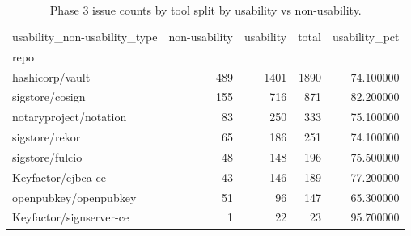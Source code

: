 \begin{table}[t]
\centering
\caption{Phase 3 issue counts by tool split by usability vs non-usability.}
\label{tab:phase3-usability-counts}
\scriptsize
\begin{tabular}{lrrrr}
\toprule
usability_non-usability_type & non-usability & usability & total & usability\_pct \\
repo &  &  &  &  \\
\midrule
hashicorp/vault & 489 & 1401 & 1890 & 74.100000 \\
sigstore/cosign & 155 & 716 & 871 & 82.200000 \\
notaryproject/notation & 83 & 250 & 333 & 75.100000 \\
sigstore/rekor & 65 & 186 & 251 & 74.100000 \\
sigstore/fulcio & 48 & 148 & 196 & 75.500000 \\
Keyfactor/ejbca-ce & 43 & 146 & 189 & 77.200000 \\
openpubkey/openpubkey & 51 & 96 & 147 & 65.300000 \\
Keyfactor/signserver-ce & 1 & 22 & 23 & 95.700000 \\
\bottomrule
\end{tabular}

\end{table}
